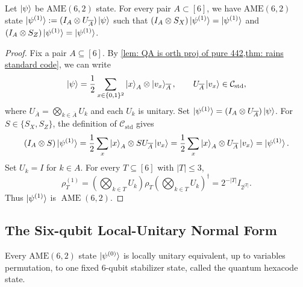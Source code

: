 \begin{corollary}\label{cor: fixed by SX and SZ}
    Let $\ket{\psi}$ be $\mathrm{AME}(6,2)$ state. For every pair $A\subset [6]$, we have $\mathrm{AME}(6,2)$ state $\ket{\psi^{(1)}}:=(I_A\otimes U_{\overline{A}})\ket{\psi}$ such that $(I_A\otimes S_X)\ket{\psi^{(1)}}=\ket{\psi^{(1)}}$ and $(I_A\otimes S_Z)\ket{\psi^{(1)}}=\ket{\psi^{(1)}}$.
\end{corollary}

\begin{proof}
Fix a pair $A\subseteq[6]$. By
\cref{lem: QA is orth proj of pure 442,thm: rains standard code},
we can write
\[
\ket{\psi}=\frac12\sum_{x\in\{0,1\}^2}
\ket{x}_A\otimes\ket{v_x}_{\overline A},
\qquad
U_{\overline A}\ket{v_x}\in\mathcal C_{\mathrm{std}},
\]
where $U_{\overline A}=\bigotimes_{k\in\overline A}U_k$
and each $U_k$ is unitary.
Set $\ket{\psi^{(1)}}=(I_A\otimes U_{\overline A})\ket{\psi}$.
For $S\in\{S_X,S_Z\}$, the definition of
$\mathcal C_{\mathrm{std}}$ gives
\[
(I_A\otimes S)\ket{\psi^{(1)}}
=\frac12\sum_x\ket{x}_A\otimes S U_{\overline A}\ket{v_x}
=\frac12\sum_x\ket{x}_A\otimes U_{\overline A}\ket{v_x}
=\ket{\psi^{(1)}}.
\]
Set $U_k=I$ for $k\in A$. For every $T\subseteq[6]$
with $|T|\leq3$,
\[
\rho_T^{(1)}
=\left(\bigotimes_{k\in T}U_k\right)
\rho_T
\left(\bigotimes_{k\in T}U_k\right)^\dagger
=2^{-|T|}I_{2^{|T|}}.
\]
Thus $\ket{\psi^{(1)}}$ is $\operatorname{AME}(6,2)$.
\end{proof}

\subsection{The Six-qubit Local-Unitary Normal Form}

\begin{lemma}\label{lem: ame62 is unitary equivalent}
    Every $\mathrm{AME}(6,2)$ state $\ket{\psi^{(0)}}$ is locally unitary equivalent, up to variables permutation, to one fixed 6-qubit stabilizer state, called the quantum hexacode state.
\end{lemma}

